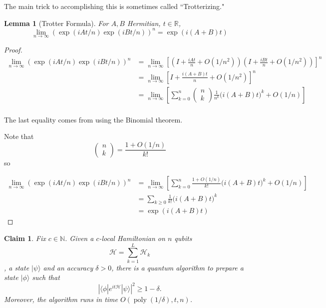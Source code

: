 \documentclass{article}
\newtheorem{lem}[thm]{Lemma}
\newtheorem{claim}{Claim}
\DeclareMathOperator{\poly}{poly}
\begin{document}
The main trick to accomplishing this is sometimes called ``Trotterizing."

\begin{lem}[Trotter Formula]
    For $A,B$ Hermitian, $t\in \mathbb R$, $$\lim_{n\to \infty}\left (\exp(iAt/n)\exp(iBt/n)\right )^n = \exp(i(A+B)t)$$
\end{lem}

\begin{proof}
    \begin{align*}
        \lim_{n\to \infty}\left (\exp(iAt/n)\exp(iBt/n)\right )^n &= \lim_{n\to \infty}\left [ \left (I+\frac{iAt}{n} + O(1/n^2)\right )\left (I+\frac{iBt}{n} + O(1/n^2)\right )\right ]^n\\
        &= \lim_{n\to\infty}\left [I+\frac{i(A+B)t}{n} + O(1/n^2)\right ]^n\\
        &= \lim_{n\to\infty}\left [\sum_{k=0}^n \begin{pmatrix} n\\k \end{pmatrix} \frac{1}{n^k} \big (i(A+B)t\big )^k + O(1/n)\right ]\\
    \end{align*}

The last equality comes from using the Binomial theorem.

Note that $$\begin{pmatrix}
    n\\k
\end{pmatrix} = \frac{1+O(1/n)}{k!}$$ so

    \begin{align*}
        \lim_{n\to \infty}\left (\exp(iAt/n)\exp(iBt/n)\right )^n&= \lim_{n\to\infty} \left [\sum_{k=0}^n \frac{1+O(1/n)}{k!} \big (i(A+B)t\big )^k + O(1/n)\right ]\\
        &= \sum_{k\geq 0} \frac{1}{k!}\big (i(A+B)t\big )^k\\
        &= \exp(i(A+B)t)
    \end{align*}
\end{proof}

\begin{claim}
    Fix $c\in \mathbb N$. Given a $c$-local Hamiltonian on $n$ qubits $$\mathcal H = \sum_{k=1}^L \mathcal H_k$$, a state $|\psi\rangle$ and an accuracy $\delta>0$, there is a quantum algorithm to prepare a state $|\phi\rangle$ such that $$\left |\langle \phi |e^{it\mathcal H}|\psi\rangle \right |^2 \geq 1-\delta.$$
Moreover, the algorithm runs in time $O(\poly(1/\delta),t,n)$.
\end{claim}
\end{document}
